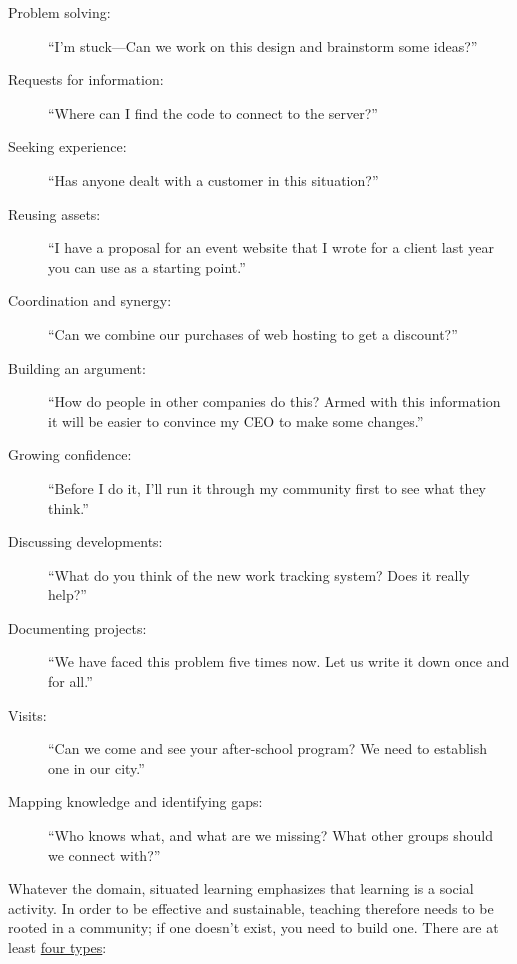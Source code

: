 \begin{description}

\item[Problem solving:] ``I'm stuck---Can we work on this design and
  brainstorm some ideas?''

\item[Requests for information:] ``Where can I find the code to
  connect to the server?''

\item[Seeking experience:] ``Has anyone dealt with a customer in this
  situation?''

\item[Reusing assets:] ``I have a proposal for an event website that I
  wrote for a client last year you can use as a starting point.''

\item[Coordination and synergy:] ``Can we combine our purchases of web
  hosting to get a discount?''

\item[Building an argument:] ``How do people in other companies do
  this?  Armed with this information it will be easier to convince my
  CEO to make some changes.''

\item[Growing confidence:] ``Before I do it, I'll run it through my
  community first to see what they think.''

\item[Discussing developments:] ``What do you think of the new work
  tracking system?  Does it really help?''

\item[Documenting projects:] ``We have faced this problem five times
  now. Let us write it down once and for all.''

\item[Visits:] ``Can we come and see your after-school program? We
  need to establish one in our city.''

\item[Mapping knowledge and identifying gaps:] ``Who knows what, and
  what are we missing? What other groups should we connect with?''

\end{description}

Whatever the domain, situated learning emphasizes that learning is a
social activity.  In order to be effective and sustainable, teaching
therefore needs to be rooted in a community; if one doesn't exist, you
need to build one.  There are at least
\href{https://www.feverbee.com/types-of-community-and-activity-within-the-community/}{four
  types}:

